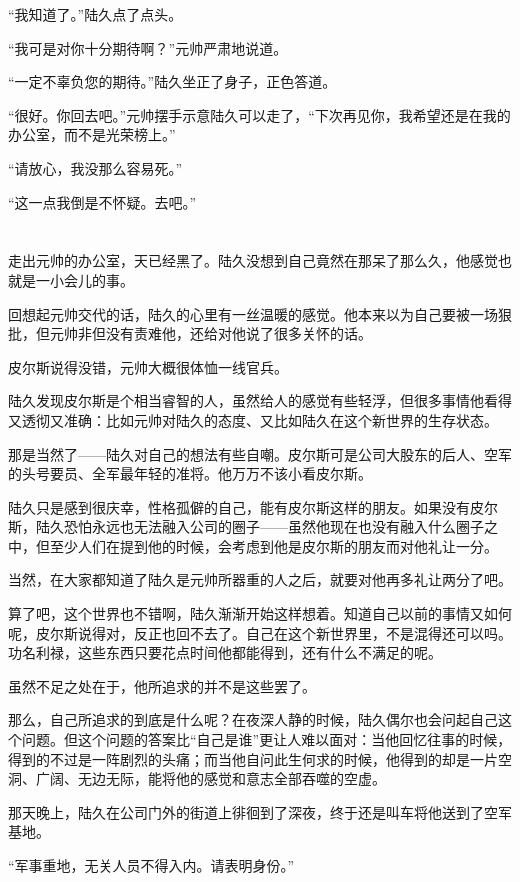 “我知道了。”陆久点了点头。

“我可是对你十分期待啊？”元帅严肃地说道。

“一定不辜负您的期待。”陆久坐正了身子，正色答道。

“很好。你回去吧。”元帅摆手示意陆久可以走了，“下次再见你，我希望还是在我的办公室，而不是光荣榜上。”

“请放心，我没那么容易死。”

“这一点我倒是不怀疑。去吧。”
\section*{}

走出元帅的办公室，天已经黑了。陆久没想到自己竟然在那呆了那么久，他感觉也就是一小会儿的事。

回想起元帅交代的话，陆久的心里有一丝温暖的感觉。他本来以为自己要被一场狠批，但元帅非但没有责难他，还给对他说了很多关怀的话。

皮尔斯说得没错，元帅大概很体恤一线官兵。

陆久发现皮尔斯是个相当睿智的人，虽然给人的感觉有些轻浮，但很多事情他看得又透彻又准确：比如元帅对陆久的态度、又比如陆久在这个新世界的生存状态。

那是当然了——陆久对自己的想法有些自嘲。皮尔斯可是公司大股东的后人、空军的头号要员、全军最年轻的准将。他万万不该小看皮尔斯。

陆久只是感到很庆幸，性格孤僻的自己，能有皮尔斯这样的朋友。如果没有皮尔斯，陆久恐怕永远也无法融入公司的圈子——虽然他现在也没有融入什么圈子之中，但至少人们在提到他的时候，会考虑到他是皮尔斯的朋友而对他礼让一分。

当然，在大家都知道了陆久是元帅所器重的人之后，就要对他再多礼让两分了吧。

算了吧，这个世界也不错啊，陆久渐渐开始这样想着。知道自己以前的事情又如何呢，皮尔斯说得对，反正也回不去了。自己在这个新世界里，不是混得还可以吗。功名利禄，这些东西只要花点时间他都能得到，还有什么不满足的呢。

虽然不足之处在于，他所追求的并不是这些罢了。

那么，自己所追求的到底是什么呢？在夜深人静的时候，陆久偶尔也会问起自己这个问题。但这个问题的答案比“自己是谁”更让人难以面对：当他回忆往事的时候，得到的不过是一阵剧烈的头痛；而当他自问此生何求的时候，他得到的却是一片空洞、广阔、无边无际，能将他的感觉和意志全部吞噬的空虚。

那天晚上，陆久在公司门外的街道上徘徊到了深夜，终于还是叫车将他送到了空军基地。

“军事重地，无关人员不得入内。请表明身份。”

